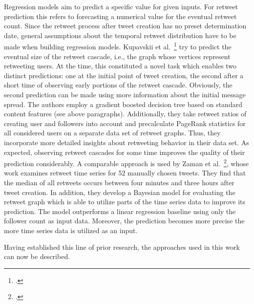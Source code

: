 Regression models aim to predict a specific value for given inputs.
For retweet prediction this refers to forecasting a numerical value for the
eventual retweet count.
Since the retweet process after tweet creation has no preset determination date, general assumptions
about the temporal retweet distribution have to be made when building
regression models.
Kupavskii et al.~\footcite{Kupavskii2012} try to predict the eventual size of the
retweet cascade, i.e., the graph whose vertices represent retweeting users.
At the time, this constituted a novel task which enables two distinct predictions:
one at the initial point of tweet creation, the second after a short
time of observing early portions of the retweet cascade.
Obviously, the second prediction can be made using more information about the
initial message spread.
The authors employ a gradient boosted decision tree based on standard content
features (see above paragraphs).
Additionally, they take retweet ratios of creating user and followers into
account and precalculate PageRank statistics for all considered users on a
separate data set of retweet graphs.
Thus, they incorporate more detailed insights about retweeting behavior in their data
set.
As expected, observing retweet cascades for some time improves the quality
of their prediction considerably.
A comparable approach is used by Zaman et al.~\footcite{Zaman2014}, whose work
examines retweet time series for 52 manually chosen tweets.
They find that the median of all retweets occurs between four minutes and three
hours after tweet creation.
In addition, they develop a Bayesian model for evaluating the retweet graph
which is able to utilize parts of the time series data to improve its
prediction.
The model outperforms a linear regression baseline using only
the follower count as input data.
Moreover, the prediction becomes more precise the more time series data is utilized
as an input.

Having established this line of prior research, the approaches used in this
work can now be described.
